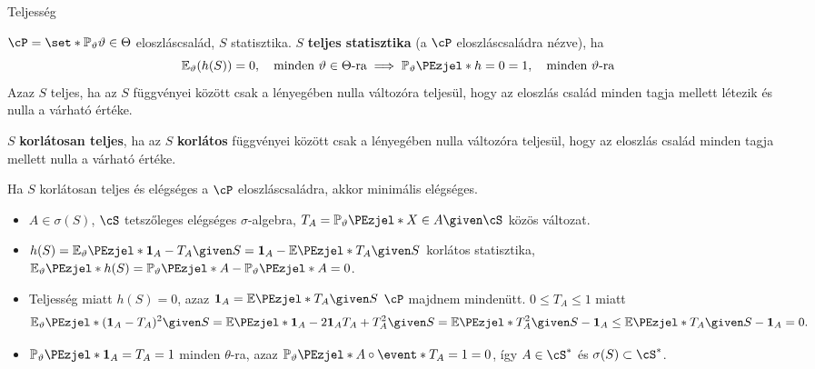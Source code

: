 \documentclass[aspectratio=169,notheorems,9pt,\option]{beamer}
\begin{document}
\maketitle

\begin{frame}{Teljesség}
    \begin{df}
      $\cP=\set*{\P[\theta]}{\theta\in\Theta}$ eloszláscsalád, 
      $S$ statisztika. $S$ \textbf{teljes statisztika} (a $\cP$ eloszláscsaládra nézve), ha 
      \begin{displaymath}
        \E[\theta](h(S))=0,\quad\text{minden $\theta\in\Theta$-ra}\implies \P[\theta]{h=0}=1,\quad\text{minden $\theta$-ra}
      \end{displaymath} 
      Azaz $S$ teljes, ha az $S$ függvényei között csak a lényegében nulla változóra teljesül, hogy  
      az eloszlás család minden tagja mellett létezik és nulla a várható értéke.
  
      $S$ \textbf{korlátosan teljes}, ha az $S$ \textbf{korlátos} függvényei között csak a 
      lényegében nulla változóra teljesül, hogy  
      az eloszlás család minden tagja mellett  nulla a várható értéke.
    \end{df}
    \begin{theorem}
      Ha $S$ korlátosan teljes és elégséges a $\cP$ eloszláscsaládra, akkor minimális elégséges. 
    \end{theorem}
    \begin{itemize}
      \item $A\in\sigma(S)$, $\cS$ tetszőleges elégséges $\sigma$-algebra, $T_A=\P[\theta]{X\in A\given \cS}$ közös változat.
      \item $h(S)=\E[\theta]{\I[A]-T_A\given S}=\I[A]-\E{T_A\given S}$ korlátos statisztika, 
      $\E[\theta]{h(S)}=\P[\theta]{A}-\P[\theta]{A}=0$.
      \item Teljesség miatt $h(S)=0$, azaz $\I[A]=\E{T_A\given S}$ $\cP$ majdnem mindenütt. $0\leq T_A\leq 1$ miatt
      \begin{displaymath}
        \E[\theta]{(\I[A]-T_A)^2\given S}=\E{\I[A]-2\I[A]T_A+T_A^2\given S}
        = \E{T_A^2\given S}-\I[A]\leq\E{T_A\given S}-\I[A]=0.
      \end{displaymath}
      \item $\P[\theta]{\I[A]=T_A}=1$ minden $\theta$-ra, 
      azaz $\P[\theta]{A\circ \event*{T_A=1}}=0$, így $A\in\cS^*$ és $\sigma(S)\subset\cS^*$.
    \end{itemize}  
  \end{frame}
  
\end{document}
